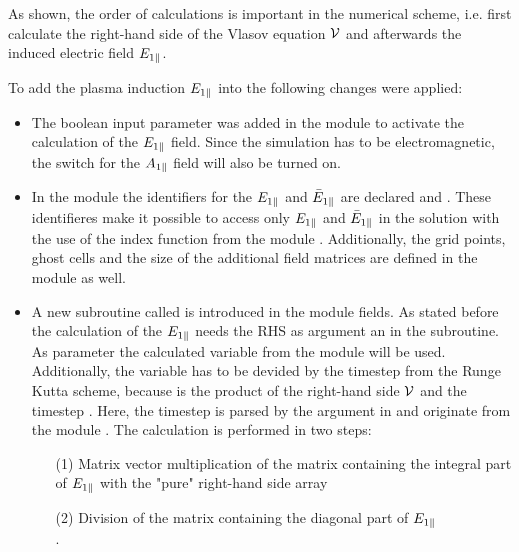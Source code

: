 As shown, the order of calculations is important in the numerical scheme, i.e. first calculate the right-hand side of the Vlasov equation $\mathcal{V}$ and afterwards the induced electric field $E_{1\parallel}$. 

\newpage

To add the plasma induction $E_{1\parallel}$ into {\gkw} the following changes were applied:
\begin{itemize}
    \item The boolean input parameter  was added in the  module to activate the calculation of the $E_{1\parallel}$ field. Since the simulation has to be electromagnetic, the switch for the $A_{1\parallel}$ field will also be turned on.
    \item In the module  the identifiers for the $E_{1\parallel}$ and $\bar{E}_{1\parallel}$ are declared  and . These identifieres make it possible to access only $E_{1\parallel}$ and $\bar{E}_{1\parallel}$ in the solution  with the use of the index function from the module . Additionally, the grid points, ghost cells and the size of the additional field matrices are defined in the module  as well.
    \item A new subroutine called  is introduced in the module fields. As stated before the calculation of the $E_{1\parallel}$ needs the RHS as argument an in the subroutine. As parameter the calculated variable  from the module  will be used. Additionally, the variable  has to be devided by the timestep  from the Runge Kutta scheme, because  is the product of the right-hand side $\mathcal{V}$ and the timestep . Here, the timestep  is parsed by the argument  in  and originate from the module . The calculation is performed in two steps:
    \begin{enumerate}
        \item [(1)] Matrix vector multiplication of the matrix containing the integral part of $E_{1\parallel}$ with the "pure" right-hand side array  \\
        \item [(2)] Division of the matrix containing the diagonal part of $E_{1\parallel}$ \\
                    .
    \end{enumerate}

\end{itemize}
